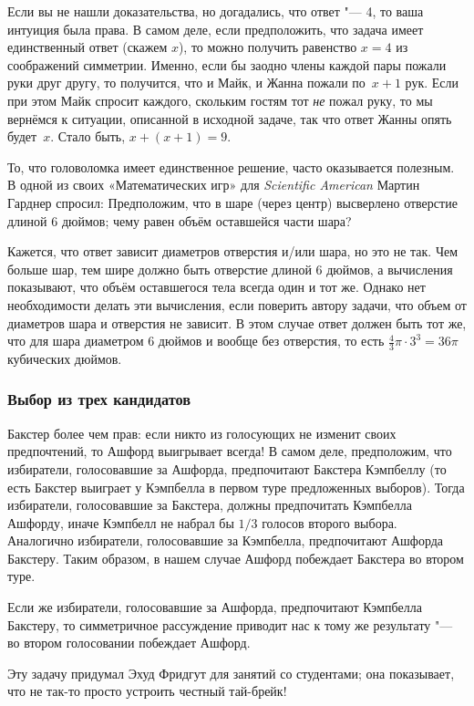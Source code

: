 \documentclass[twoside]{book}
\begin{document}
\medskip
Если вы не нашли доказательства, но догадались, что ответ "--- 4, то
ваша интуиция была права.
В самом деле, если предположить, что задача
имеет единственный ответ (скажем $x$), то можно получить равенство
$x=4$ из соображений симметрии.
Именно, если бы заодно члены каждой
пары пожали руки друг другу, то получится, что и Майк, и Жанна пожали
по~$x+1$ рук. Если при этом Майк спросит каждого, скольким гостям тот
\emph{не} пожал руку, то мы вернёмся к ситуации, описанной в исходной
задаче, так что ответ Жанны опять будет~$x$. Стало быть, $x+(x+1)=9$.

То, что головоломка имеет единственное решение, часто оказывается полезным.
В одной из своих «Математических игр» для \emph{Scientific American} Мартин Гарднер спросил:
Предположим, что в шаре (через центр) высверлено отверстие длиной 6 дюймов;
чему равен объём оставшейся части шара?

Кажется, что ответ зависит диаметров отверстия и/или шара, но это не так.
Чем больше шар, тем шире должно быть отверстие длиной 6 дюймов,
а вычисления показывают, что объём оставшегося тела всегда один и тот же.
% 
Однако нет необходимости делать эти вычисления, если поверить автору
задачи, что объем от диаметров шара и отверстия не зависит. В этом
случае 
ответ должен быть тот же, что для шара диаметром 6 дюймов и вообще
без отверстия, то есть $\tfrac43 \pi \cdot 3^3=36\pi$ кубических дюймов.

\subsubsection*{Выбор из трех кандидатов}%

Бакстер более чем прав: 
если никто из голосующих не изменит своих предпочтений, то
Ашфорд выигрывает всегда!
В самом деле, предположим, что избиратели, голосовавшие за Ашфорда,
предпочитают Бакстера Кэмпбеллу (то есть Бакстер выиграет у Кэмпбелла в
первом туре предложенных выборов).
Тогда избиратели, голосовавшие за Бакстера, должны предпочитать
Кэмпбелла Ашфорду, иначе Кэмпбелл не набрал бы $1/3$ голосов второго выбора.
Аналогично избиратели, голосовавшие за Кэмпбелла, предпочитают Ашфорда
Бакстеру.
Таким образом, в нашем случае Ашфорд побеждает Бакстера во втором
туре.

Если же избиратели, голосовавшие за Ашфорда, предпочитают Кэмпбелла Бакстеру, то симметричное рассуждение приводит нас к тому же результату "--- во втором голосовании побеждает Ашфорд.
\heart

\medskip
Эту задачу придумал Эхуд Фридгут %
для занятий со студентами;
она показывает, что не так-то просто устроить честный тай-брейк!
\end{document}
